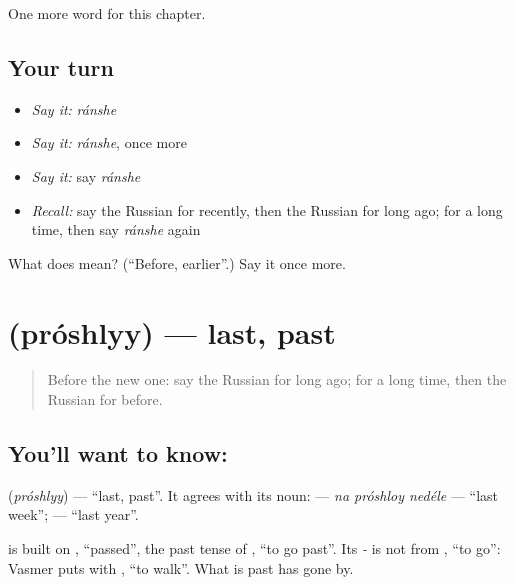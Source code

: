 \begin{grammarlens}[title={What you've built}]
One more word for this chapter.
\end{grammarlens}

\subsection*{Your turn}
\begin{itemize}
\raggedright
  \item \emph{Say it:} \emph{ránshe}
  \item \emph{Say it:} \emph{ránshe}, once more
  \item \emph{Say it:} say \emph{ránshe}
  \item \emph{Recall:} say the Russian for recently, then the Russian for long ago; for a long time, then say \emph{ránshe} again
\end{itemize}

\begin{tcolorbox}[breakable,colback=teal!4,colframe=teal!35!black,title={Before you move on}]
What does  mean? (\textquotedblleft{}Before, earlier\textquotedblright{}.) Say it once more.
\end{tcolorbox}
\section[\texorpdfstring{\ru{прошлый} (próshlyy)}{прошлый (próshlyy)}]{ (próshlyy) — last, past}

\label{lesson:RU-C137-proshlyy}



\begin{quote}
Before the new one: say the Russian for long ago; for a long time, then the Russian for before.
\end{quote}

\subsection*{You'll want to know: }
\textbf{} (\emph{próshlyy}) — \textquotedblleft{}last, past\textquotedblright{}. It agrees with its noun: \textbf{  } — \emph{na próshloy nedéle} — \textquotedblleft{}last week\textquotedblright{}; \textbf{  } — \textquotedblleft{}last year\textquotedblright{}.

\begin{cousinweb}
\textbf{} is built on \emph{}, \textquotedblleft{}passed\textquotedblright{}, the past tense of \emph{}, \textquotedblleft{}to go past\textquotedblright{}. Its \emph{-} is not from \emph{}, \textquotedblleft{}to go\textquotedblright{}: Vasmer puts \emph{} with \emph{}, \textquotedblleft{}to walk\textquotedblright{}. What is past has gone by.
\end{cousinweb}

